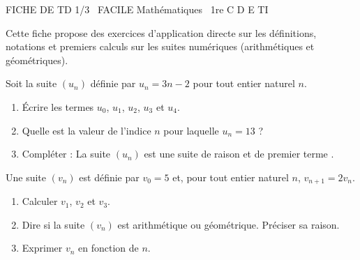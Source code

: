 \documentclass[11pt]{article}
\begin{document}
\begin{tcolorbox}[enhanced,colback=popink,colframe=popink,arc=10pt,boxrule=0pt,left=12pt,right=12pt,top=9pt,bottom=9pt]
{\color{white}\popxbold\small FICHE DE TD 1/3 \textbullet\ FACILE \hfill Mathématiques \textbullet\ 1re C D E TI\par}
\end{tcolorbox}
\vspace{4pt}
Cette fiche propose des exercices d'application directe sur les définitions, notations et premiers calculs sur les suites numériques (arithmétiques et géométriques).

\begin{exercice}
Soit la suite $(u_n)$ définie par $u_n = 3n - 2$ pour tout entier naturel $n$.
\begin{enumerate}
    \item Écrire les termes $u_0$, $u_1$, $u_2$, $u_3$ et $u_4$.
    \item Quelle est la valeur de l'indice $n$ pour laquelle $u_n = 13$ ?
    \item Compléter : La suite $(u_n)$ est une suite \underline{\hspace{3cm}} de raison \underline{\hspace{2cm}} et de premier terme \underline{\hspace{2cm}}.
\end{enumerate}
\end{exercice}

\begin{exercice}
Une suite $(v_n)$ est définie par $v_0 = 5$ et, pour tout entier naturel $n$, $v_{n+1} = 2v_n$.
\begin{enumerate}
    \item Calculer $v_1$, $v_2$ et $v_3$.
    \item Dire si la suite $(v_n)$ est arithmétique ou géométrique. Préciser sa raison.
    \item Exprimer $v_n$ en fonction de $n$.
\end{enumerate}
\end{exercice}
\end{document}
